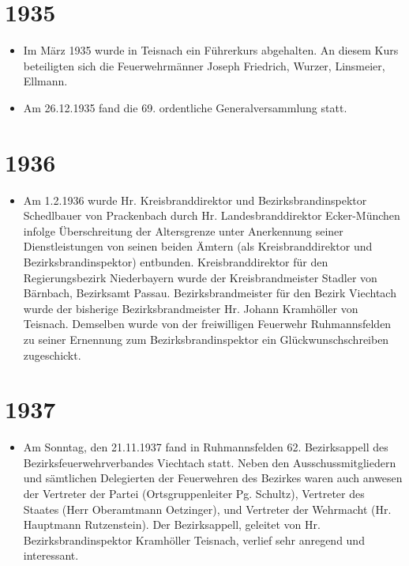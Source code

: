 \documentclass[12pt,a4paper]{book}
\begin{document}
\section*{1935}

\begin{itemize}
\item Im März 1935 wurde in Teisnach ein Führerkurs abgehalten. An diesem Kurs
beteiligten sich die Feuerwehrmänner Joseph Friedrich, Wurzer, Linsmeier,
Ellmann.

\item Am 26.12.1935 fand die 69. ordentliche Generalversammlung statt.
\end{itemize}

\section*{1936}

\begin{itemize}
\item Am 1.2.1936 wurde Hr. Kreisbranddirektor und Bezirksbrandinspektor
Schedlbauer von Prackenbach durch Hr. Landesbranddirektor Ecker-München infolge
Überschreitung der Altersgrenze unter Anerkennung seiner Dienstleistungen von
seinen beiden Ämtern (als Kreisbranddirektor und Bezirksbrandinspektor)
entbunden. Kreisbranddirektor für den Regierungsbezirk Niederbayern wurde der
Kreisbrandmeister Stadler von Bärnbach, Bezirksamt Passau. Bezirksbrandmeister
für den Bezirk Viechtach wurde der bisherige Bezirksbrandmeister Hr. Johann
Kramhöller von Teisnach. Demselben wurde von der freiwilligen Feuerwehr
Ruhmannsfelden zu seiner Ernennung zum Bezirksbrandinspektor ein
Glückwunschschreiben zugeschickt.
\end{itemize}

\section*{1937}

\begin{itemize}
\item Am Sonntag, den 21.11.1937 fand in Ruhmannsfelden 62. Bezirksappell des
Bezirksfeuerwehrverbandes Viechtach statt. Neben den Ausschussmitgliedern und
sämtlichen Delegierten der Feuerwehren des Bezirkes waren auch anwesen der
Vertreter der Partei (Ortsgruppenleiter Pg. Schultz), Vertreter des Staates
(Herr Oberamtmann Oetzinger), und Vertreter der Wehrmacht (Hr. Hauptmann
Rutzenstein). Der Bezirksappell, geleitet von Hr. Bezirksbrandinspektor
Kramhöller Teisnach, verlief sehr anregend und interessant.
\end{itemize}
\end{document}
